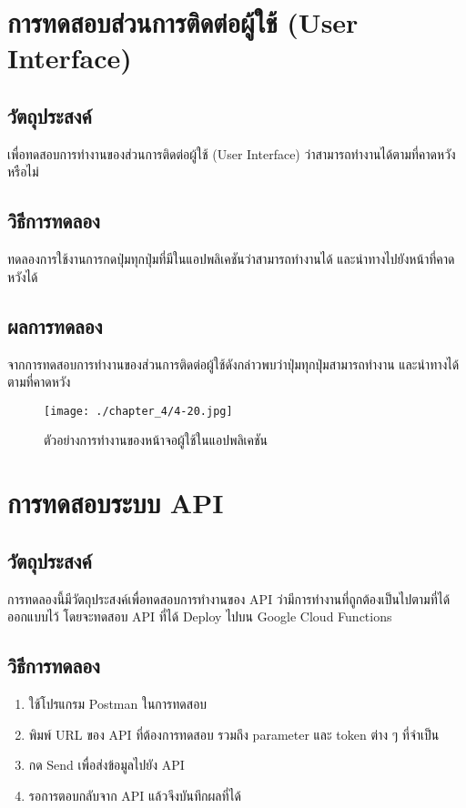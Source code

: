\section{การทดสอบส่วนการติดต่อผู้ใช้ (User Interface)}
\subsection{วัตถุประสงค์}
เพื่อทดสอบการทำงานของส่วนการติดต่อผู้ใช้ (User Interface) ว่าสามารถทำงานได้ตามที่คาดหวังหรือไม่
\subsection{วิธีการทดลอง}
ทดลองการใช้งานการกดปุ่มทุกปุ่มที่มีในแอปพลิเคชันว่าสามารถทำงานได้ และนำทางไปยังหน้าที่คาดหวังได้
\subsection{ผลการทดลอง}
จากการทดสอบการทำงานของส่วนการติดต่อผู้ใช้ดังกล่าวพบว่าปุ่มทุกปุ่มสามารถทำงาน และนำทางได้ตามที่คาดหวัง
\begin{figure}
	\texttt{[image: ./chapter\_4/4-20.jpg]}
	\caption{ตัวอย่างการทำงานของหน้าจอผู้ใช้ในแอปพลิเคชัน}
\end{figure}

\section{การทดสอบระบบ API}
\subsection{วัตถุประสงค์}
การทดลองนี้มีวัตถุประสงค์เพื่อทดสอบการทำงานของ API ว่ามีการทำงานที่ถูกต้องเป็นไปตามที่ได้ออกแบบไว้ โดยจะทดสอบ API ที่ได้ Deploy ไปบน Google Cloud Functions
\subsection{วิธีการทดลอง}
\begin{enumerate}
	\item ใช้โปรแกรม Postman ในการทดสอบ
	\item พิมพ์ URL ของ API ที่ต้องการทดสอบ รวมถึง parameter และ token ต่าง ๆ ที่จำเป็น
	\item กด Send เพื่อส่งข้อมูลไปยัง API
	\item รอการตอบกลับจาก API แล้วจึงบันทึกผลที่ได้
\end{enumerate}
